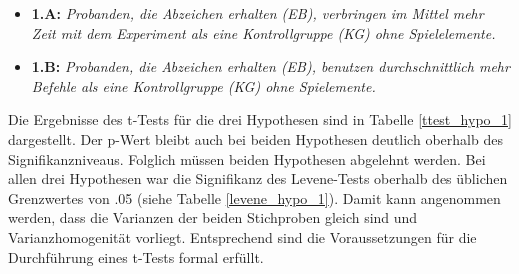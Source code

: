 \begin{itemize}
    \item \textbf{1.A:} \textit{Probanden, die Abzeichen erhalten (EB), verbringen im Mittel mehr Zeit mit dem Experiment als eine Kontrollgruppe (KG) ohne Spielelemente.}
    \item \textbf{1.B:} \textit{Probanden, die Abzeichen erhalten (EB), benutzen durchschnittlich mehr Befehle als eine Kontrollgruppe (KG) ohne Spielemente.} 
\end{itemize}

Die Ergebnisse des t-Tests für die drei Hypothesen sind in Tabelle \ref{ttest_hypo_1} dargestellt. Der p-Wert bleibt auch bei beiden Hypothesen deutlich oberhalb des Signifikanzniveaus. Folglich müssen beiden Hypothesen abgelehnt werden. Bei allen drei Hypothesen war die Signifikanz des Levene-Tests oberhalb des üblichen Grenzwertes von .05 (siehe Tabelle \ref{levene_hypo_1}). Damit kann angenommen werden, dass die Varianzen der beiden Stichproben gleich sind und Varianzhomogenität vorliegt. Entsprechend sind die Voraussetzungen für die Durchführung eines t-Tests formal erfüllt.

